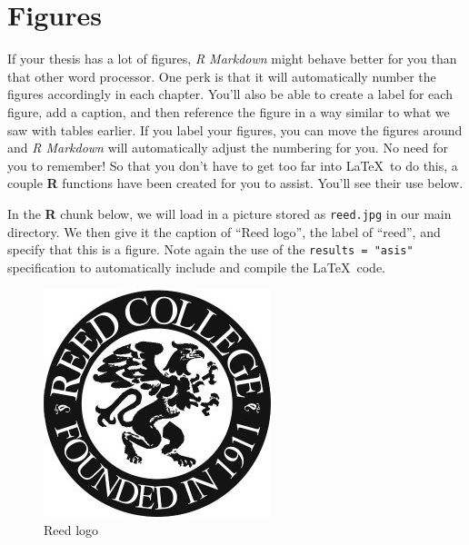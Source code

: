 \documentclass[12pt,twoside]{reedthesis}
\begin{document}
  \section{Figures}\label{figures}
  
  If your thesis has a lot of figures, \emph{R Markdown} might behave
  better for you than that other word processor. One perk is that it will
  automatically number the figures accordingly in each chapter. You'll
  also be able to create a label for each figure, add a caption, and then
  reference the figure in a way similar to what we saw with tables
  earlier. If you label your figures, you can move the figures around and
  \emph{R Markdown} will automatically adjust the numbering for you. No
  need for you to remember! So that you don't have to get too far into
  \LaTeX~to do this, a couple \textbf{R} functions have been created for
  you to assist. You'll see their use below.
  
  In the \textbf{R} chunk below, we will load in a picture stored as
  \texttt{reed.jpg} in our main directory. We then give it the caption of
  ``Reed logo'', the label of ``reed'', and specify that this is a figure.
  Note again the use of the \texttt{results\ =\ "asis"} specification to
  automatically include and compile the \LaTeX~code.
  
  \begin{Shaded}
  \begin{Highlighting}[]
  \NormalTok{(} \NormalTok{, } \NormalTok{, }
         \NormalTok{, } \NormalTok{)}
  \end{Highlighting}
  \end{Shaded}
  
  \begin{figure}[h!tbp]
  \centering
  \includegraphics[angle = 0,scale = 1]{figure/reed.jpg}
  \caption[Reed logo]{\normalsize{Reed logo}}
  \label{fig:reed}
  \end{figure}
  
\end{document}
